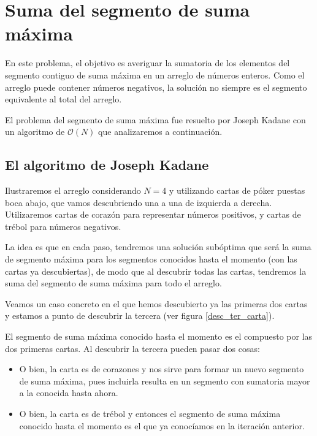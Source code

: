 \documentclass[12pt, a4paper, openany, fleqn]{book}
\newif\ifUsePstPoker
\begin{document}
    \section{Suma del segmento de suma máxima}

    En este problema, el objetivo es averiguar la sumatoria de los elementos del segmento contiguo de suma máxima en un arreglo de números enteros.
    Como el arreglo puede contener números negativos, la solución no siempre es el segmento equivalente al total del arreglo.

    El problema del segmento de suma máxima fue resuelto por Joseph Kadane con un algoritmo de $\mathcal{O}(N)$ que analizaremos a continuación.

    \subsection*{El algoritmo de Joseph Kadane}
    Ilustraremos el arreglo considerando $N=4$ y utilizando cartas de póker puestas boca abajo, que vamos descubriendo una a una de izquierda a derecha. Utilizaremos cartas de corazón para representar números positivos, y cartas de trébol para números negativos.

    La idea es que en cada paso, tendremos una solución subóptima que será la suma de segmento máxima para los segmentos conocidos hasta el momento (con las cartas ya descubiertas), de modo que al descubrir todas las cartas, tendremos la suma del segmento de suma máxima para todo el arreglo.

    Veamos un caso concreto en el que hemos descubierto ya las primeras dos cartas y estamos a punto de descubrir la tercera (ver figura \ref{desc_ter_carta}).

    \ifUsePstPoker
        \begin{figure}[h]
            \centering
            \psset{framebg=beige}\crdsevh
            \psset{framebg=beige}\crdtwoh
            \psset{backcolor=red}\crdback
            \psset{backcolor=red}\crdback
            \rput(-4.8,-1){\textbf{\^}} %

            \caption{Descubriendo la tercera carta} \label{desc_ter_carta}
        \end{figure}
    \fi

    El segmento de suma máxima conocido hasta el momento es el compuesto por las dos primeras cartas. Al descubrir la tercera pueden pasar dos cosas:
    \begin{itemize}
        \item O bien, la carta es de corazones y nos sirve para formar un nuevo segmento de suma máxima, pues incluirla resulta en un segmento con sumatoria mayor a la conocida hasta ahora.
        \item O bien, la carta es de trébol y entonces el segmento de suma máxima conocido hasta el momento es el que ya conocíamos en la iteración anterior.
    \end{itemize}
\end{document}
